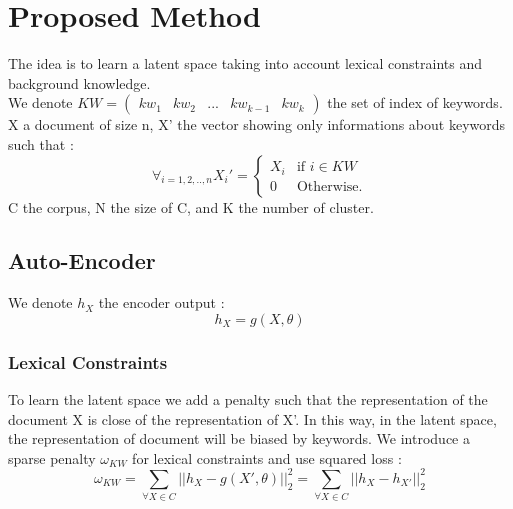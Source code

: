 \section{Proposed Method}
The idea is to learn a latent space taking into account lexical constraints and
background knowledge.
\\We denote $KW = \begin{pmatrix} kw_1 & kw_2 & ... & kw_{k-1} & kw_{k}
\end {pmatrix}$
the set of index of keywords. X a document of size n,
X' the vector showing only informations about keywords such that :
\begin{equation*}
\forall_{i=1,2,..,n}X_i' = \left\{
\begin{array}{ll}
  X_i & \mbox{if } i \in KW \\
  0 & \mbox{Otherwise.}
\end{array}
\right.
\end{equation*}
C the corpus, N the size of C, and K the number of cluster.
\subsection{Auto-Encoder}
We denote $h_X$ the encoder output : 
\begin{equation}\label{eq:h}
  h_X = g(X,\theta)
\end{equation}
\subsubsection{Lexical Constraints}
To learn the latent space we add a penalty such that the representation
of the document X is close of the representation of X'. In this way, in the
latent space, the representation of document will be biased by keywords.
We introduce a sparse penalty $\omega_{KW}$ for lexical constraints and
use squared loss : 
\begin{equation}\label{eq:omega1}
  \omega_{KW} = \sum_{\forall{X\in C}} || h_X - g(X',\theta) ||_2^2 =
  \sum_{\forall{X\in C}} || h_X - h_{X'}||_2^2
\end{equation}
